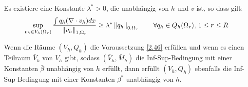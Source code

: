 \begin{voraussetzung}\label{2.46}
  Es existiere eine Konstante $\lambda^{*} > 0$, die unabhängig von $h$ und $v$ ist, so dass gilt:
  \begin{align*}
    \sup_{v_{h}\in V_{h}(\Omega_{r})} \frac{\int q_{h} (\nabla\cdot v_{h}) dx}{ \left \|v_{h} \right\|_{1, \Omega_{r}}} \geq \lambda^{*} \left \|q_{h} \right\|_{0, \Omega_{r}}\qquad \forall q_{h} \in Q_{h}(\Omega_{r}), \, 1 \leq r\leq R
  \end{align*}
\end{voraussetzung}
\begin{satz}
  Wenn die Räume $(V_{h}, Q_{h})$ die Voraussetzung \ref{2.46} erfüllen und wenn es einen Teilraum $\bar V_{h}$ von $V_{h}$ gibt, sodass $(\bar V_{h}, \bar M_{h})$ die Inf-Sup-Bedingung mit einer Konstanten $\bar \beta$ unabhängig von $h$ erfüllt, dann erfüllt $(V_{h}, Q_{h})$ ebenfalls die Inf-Sup-Bedingung mit einer Konstanten $\beta^{*}$ unabhängig von $h$. 
\end{satz}
